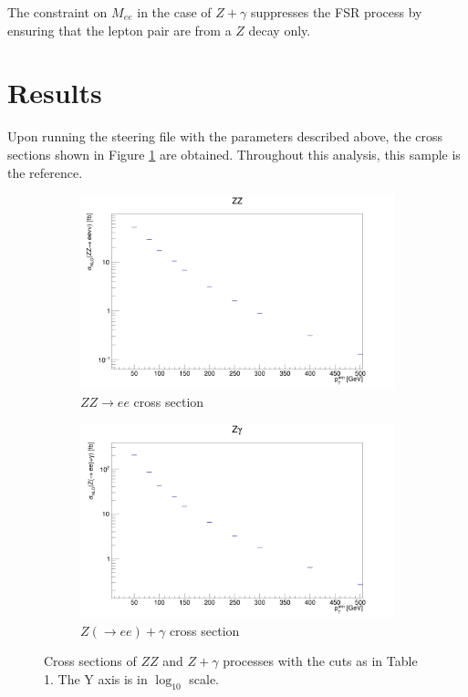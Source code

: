 \documentclass[11pt,a4paper,final]{report}
\begin{document}
The constraint on $M_{ee}$ in the case of $Z+\gamma$ suppresses the FSR process by ensuring that the lepton pair are from a $Z$ decay only.

\section{Results}
Upon running the steering file with the parameters described above, the cross sections shown in Figure \ref{xsecs} are obtained. Throughout this analysis, this sample is the reference.

\begin{figure}[H]
\centering
	\begin{subfigure}{0.49\textwidth}
		\includegraphics[width=\linewidth]{ZZ_xsec.png}
		\caption{$ZZ\rightarrow ee$ cross section}
	\end{subfigure}	
	\begin{subfigure}{0.49\textwidth}
		\includegraphics[width=\linewidth]{Zg_xsec.png}
		\caption{$Z(\rightarrow ee)+\gamma$ cross section}
	\end{subfigure}
	
	\caption{Cross sections of $ZZ$ and $Z+\gamma$ processes with the cuts as in Table 1. The Y axis is in $\log_{10}$ scale.}
	\label{xsecs}
\end{figure}
\end{document}

